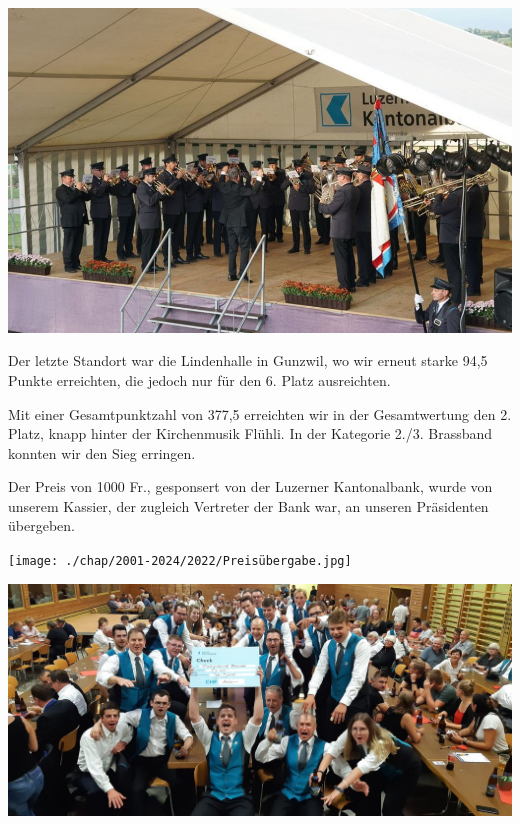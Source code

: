 \begin{history}
    \begin{MulticolFigure}
        \centering
        \includegraphics[width=0.9\linewidth]{./chap/2001-2024/2022/Knutwil-2.jpg}
    \end{MulticolFigure}

    Der letzte Standort war die Lindenhalle in Gunzwil, wo wir erneut starke
    94,5 Punkte erreichten, die jedoch nur für den 6. Platz ausreichten.

    Mit einer Gesamtpunktzahl von 377,5 erreichten wir in der Gesamtwertung den
    2. Platz, knapp hinter der Kirchenmusik Flühli. In der Kategorie 2./3.
    Brassband konnten wir den Sieg erringen.

    Der Preis von 1000 Fr., gesponsert von der Luzerner Kantonalbank, wurde von
    unserem Kassier, der zugleich Vertreter der Bank war, an unseren Präsidenten
    übergeben.

    \begin{MulticolFigure}
        \centering
        \texttt{[image: ./chap/2001-2024/2022/Preisübergabe.jpg]}
    \end{MulticolFigure}


    \begin{MulticolFigure}
        \centering
        \includegraphics[width=0.93\linewidth]{./chap/2001-2024/2022/Feier-Welle.jpg}
    \end{MulticolFigure}



\end{history}
